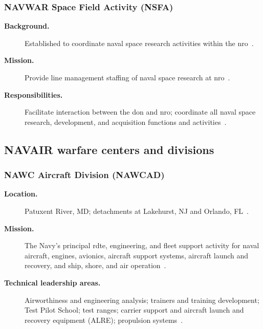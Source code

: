 \documentclass[../main.tex]{subfiles}
\begin{document}
\subsubsection{NAVWAR Space Field Activity (NSFA)}
\begin{description}
  \item[\textbf{Background.}] Established to coordinate naval space research activities within the \ac{nro}~\autocite{edo-2-1-4-warfare-centers-2024}.
  \item[\textbf{Mission.}] Provide line management staffing of naval space research at \ac{nro}~\autocite{edo-2-1-4-warfare-centers-2024}.
  \item[\textbf{Responsibilities.}] Facilitate interaction between the \ac{don} and \ac{nro}; coordinate all naval space research, development, and acquisition functions and activities~\autocite{edo-2-1-4-warfare-centers-2024}.
\end{description}

\subsection{NAVAIR warfare centers and divisions}
\subsubsection{NAWC Aircraft Division (NAWCAD)}
\begin{description}
  \item[\textbf{Location.}] Patuxent River, MD; detachments at Lakehurst, NJ and Orlando, FL~\autocite{edo-2-1-4-warfare-centers-2024}.
  \item[\textbf{Mission.}] The Navy's principal \ac{rdte}, engineering, and fleet support activity for naval aircraft, engines, avionics, aircraft support systems, aircraft launch and recovery, and ship, shore, and air operation~\autocite{edo-2-1-4-warfare-centers-2024}.
  \item[\textbf{Technical leadership areas.}] Airworthiness and engineering analysis; trainers and training development; Test Pilot School; test ranges; carrier support and aircraft launch and recovery equipment (ALRE); propulsion systems~\autocite{edo-2-1-4-warfare-centers-2024}.
\end{description}
\end{document}
